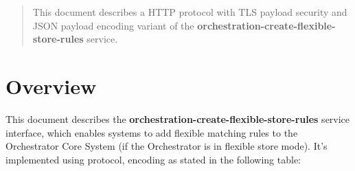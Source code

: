 \documentclass[a4paper]{arrowhead}
\begin{document}
\ArrowheadDate{\today}
\ArrowheadSetup

\begin{center}
  \vspace*{1cm}
  \huge{\arrowtitle}

  \vspace*{0.2cm}
  \LARGE{\arrowtype}
  \vspace*{1cm}
\end{center}

  \vspace*{\fill}


  \vspace*{1cm}
  \vspace*{\fill}

  \begin{abstract}
    This document describes a HTTP protocol with TLS payload
    security and JSON payload encoding variant of the \textbf{orchestration-create-flexible-store-rules} service.
  \end{abstract}
  \vspace*{1cm}

\newpage

\tableofcontents
\newpage

\section{Overview}
\label{sec:overview}

This document describes the \textbf{orchestration-create-flexible-store-rules} service interface,
which enables systems to add flexible matching rules to the Orchestrator Core System (if the Orchestrator is in flexible store mode). It's implemented using protocol, encoding as stated in the following table:
\end{document}

